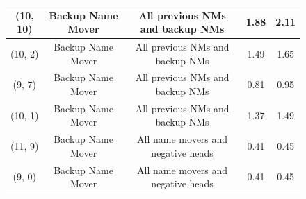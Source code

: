 \begin{figure}
\begin{tabular}{ |c|c|c|c|c| }
\hline
(10, 10) & Backup Name Mover & All previous NMs and backup NMs & 1.88 & 2.11 \\
\hline
(10, 2) & Backup Name Mover & All previous NMs and backup NMs & 1.49 & 1.65 \\
\hline
(9, 7) & Backup Name Mover & All previous NMs and backup NMs & 0.81 & 0.95 \\
\hline
(10, 1) & Backup Name Mover & All previous NMs and backup NMs & 1.37 & 1.49 \\
\hline
(11, 9) & Backup Name Mover & All name movers and negative heads & 0.41 & 0.45 \\
\hline
(9, 0) & Backup Name Mover & All name movers and negative heads & 0.41 & 0.45 \\
\hline


\end{tabular}
\end{figure}
